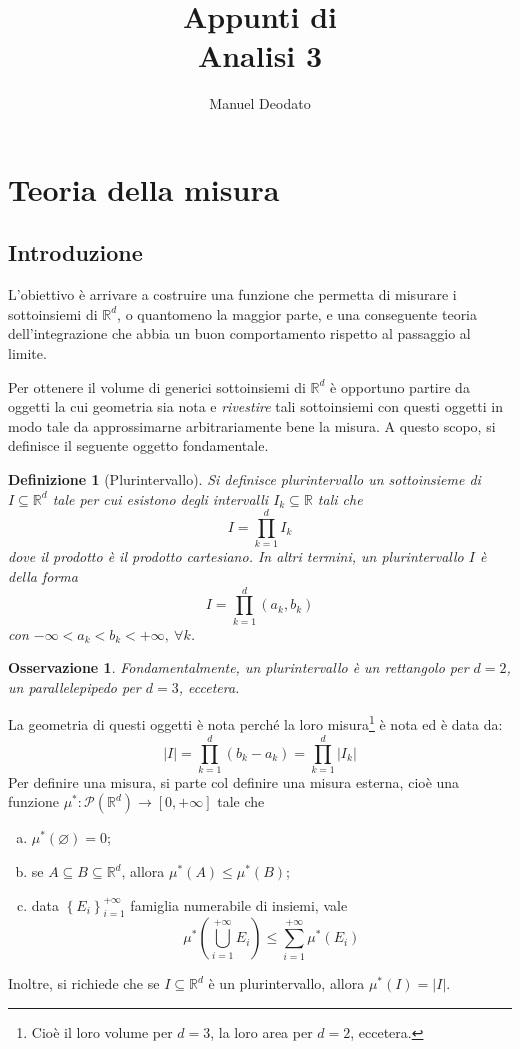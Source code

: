 \documentclass[11pt]{article}
\title{Appunti di\\ \vspace{.3cm} Analisi 3}
\author{Manuel Deodato}
\date{}
\theoremstyle{style}
\newtheorem{definizione}{Definizione}[section]
\newtheorem{osservazione}{Osservazione}[section]
\renewcommand{\maketitle}{
\begin{center}
{\sffamily
{\fontsize{20}{20}\selectfont\MakeUppercase\thetitle}}

\vspace{0.2in}

{\large\scshape\theauthor}
\end{center}
}
\numberwithin{equation}{subsection}
\begin{document}
\maketitle
\newpage
\tableofcontents
\newpage
\section{Teoria della misura}
\subsection{Introduzione}
	L'obiettivo \`e arrivare a costruire una funzione che permetta di misurare i sottoinsiemi di $\mathbb{R}^d$, o quantomeno la maggior parte, e una conseguente teoria dell'integrazione che abbia un buon comportamento rispetto al passaggio al limite.

	Per ottenere il volume di generici sottoinsiemi di $\mathbb{R}^d$ \`e opportuno partire da oggetti la cui geometria sia nota e \textit{rivestire} tali sottoinsiemi con questi oggetti in modo tale da approssimarne arbitrariamente bene la misura.
	A questo scopo, si definisce il seguente oggetto fondamentale.
	\begin{definizione}
		[Plurintervallo]
	Si definisce \textit{plurintervallo} un sottoinsieme di $I \subseteq \mathbb{R}^d$ tale per cui esistono degli intervalli $I_k \subseteq \mathbb{R}$ tali che
	\[
	I = \prod_{k=1} ^d I_k
	\] 
	dove il prodotto \`e il prodotto cartesiano.
	In altri termini, un plurintervallo $I$ \`e della forma
	\[
	I = \prod_{k=1} ^d (a_k,b_k)
	\] 
	con $-\infty < a_k < b_k <+\infty, \ \forall k$.
	\end{definizione}
	\begin{osservazione}
	Fondamentalmente, un plurintervallo \`e un rettangolo per $d=2$, un parallelepipedo per $d=3$, eccetera.
	\end{osservazione}
	La geometria di questi oggetti \`e nota perch\'e la loro misura\footnote{Cio\`e il loro volume per $d=3$, la loro area per $d=2$, eccetera.} \`e nota ed \`e data da:
	\[
	\lvert I \rvert  = \prod_{k=1} ^d (b_k - a_k) = \prod_{k=1} ^d \lvert I_k \rvert 
	\] 
	Per definire una misura, si parte col definire una misura esterna, cio\`e una funzione $\mu^*  : \mathcal{P} (\mathbb{R}^d) \to [0,+\infty]$ tale che
	\begin{enumerate}[(a).]
		\item $\mu^* (\varnothing)=0$;
		\item se $A \subseteq B \subseteq \mathbb{R}^d$, allora $\mu^* (A) \le \mu^* (B)$;
		\item data $\left\{ E_i \right\} _{i=1} ^{+\infty} $ famiglia numerabile di insiemi, vale
			\[
			\mu^* \left(\bigcup_{i=1} ^{+\infty} E_i\right) \le \sum_{i=1}^{+\infty} \mu^* (E_i)
			\] 
	\end{enumerate}
	Inoltre, si richiede che se $I \subseteq \mathbb{R}^d$ \`e un plurintervallo, allora $\mu^* (I) = \lvert I \rvert $.
\end{document}
